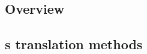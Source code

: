 

\subsection{Overview} \label{system_design_overview}


\subsection{\texorpdfstring{}{Composite}s translation methods}
